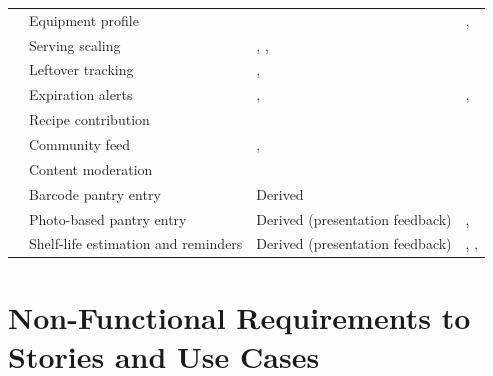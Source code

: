 \begin{tabularx}{\linewidth}{L{1.9cm}L{2.6cm}L{2.5cm}Y}
 & Equipment profile &  & , \\
 & Serving scaling & , ,  & \\
 & Leftover tracking & ,  & \\
 & Expiration alerts & ,  & , \\
 & Recipe contribution &  & \\
 & Community feed & ,  & \\
 & Content moderation &  & \\
 & Barcode pantry entry & Derived & \\
 & Photo-based pantry entry & Derived (presentation feedback) & , \\
 & Shelf-life estimation and reminders & Derived (presentation feedback) & , , \\
\end{tabularx}

\section{Non-Functional Requirements to Stories and Use Cases}

